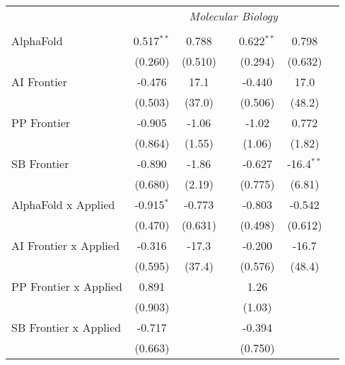 \begin{tabular}{lcccccc}
 & \multicolumn{6}{c}{\textit{Molecular Biology}} \\ \\
   AlphaFold                      & 0.517$^{**}$ & 0.788   &               & 0.622$^{**}$ & 0.798        &   \\   
                                  & (0.260)      & (0.510) &               & (0.294)      & (0.632)      &   \\   
   AI Frontier                    & -0.476       & 17.1    &               & -0.440       & 17.0         &   \\   
                                  & (0.503)      & (37.0)  &               & (0.506)      & (48.2)       &   \\   
   PP Frontier                    & -0.905       & -1.06   &               & -1.02        & 0.772        &   \\   
                                  & (0.864)      & (1.55)  &               & (1.06)       & (1.82)       &   \\   
   SB Frontier                    & -0.890       & -1.86   &               & -0.627       & -16.4$^{**}$ &   \\   
                                  & (0.680)      & (2.19)  &               & (0.775)      & (6.81)       &   \\   
   AlphaFold x Applied            & -0.915$^{*}$ & -0.773  &               & -0.803       & -0.542       &   \\   
                                  & (0.470)      & (0.631) &               & (0.498)      & (0.612)      &   \\   
   AI Frontier x Applied          & -0.316       & -17.3   &               & -0.200       & -16.7        &   \\   
                                  & (0.595)      & (37.4)  &               & (0.576)      & (48.4)       &   \\   
   PP Frontier x Applied          & 0.891        &         &               & 1.26         &              &   \\   
                                  & (0.903)      &         &               & (1.03)       &              &   \\   
   SB Frontier x Applied          & -0.717       &         &               & -0.394       &              &   \\   
                                  & (0.663)      &         &               & (0.750)      &              &   \\   

\end{tabular}
